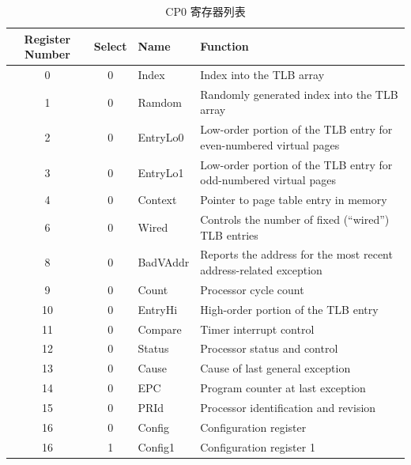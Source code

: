 \documentclass[blue,normal,cn,hide]{elegantbook}
\begin{document}
 \begin{table}
    \renewcommand\arraystretch{1.25}
    \centering
    \begin{tabular}{cclm{}}
        \toprule 
        \rowcolor{black!20} \textbf{Register Number} & \textbf{Select} & \textbf{Name} & \textbf{Function} \\
        \midrule
        \rowcolor{green!20} 0 & 0 & Index & Index into the TLB array \\
        \rowcolor{green!20} 1 & 0 & Ramdom & Randomly generated index into the TLB array \\
        \rowcolor{green!20} 2 & 0 & EntryLo0 & Low-order portion of the TLB entry for
        even-numbered virtual pages \\
        \rowcolor{green!20} 3 & 0 & EntryLo1 & Low-order portion of the TLB entry for
        odd-numbered virtual pages \\
        \rowcolor{green!20} 4 & 0 & Context & Pointer to page table entry in memory \\
        \rowcolor{green!20} 6 & 0 & Wired & Controls the number of fixed (“wired”) TLB
        entries \\
        \rowcolor{cyan!20} 8 & 0 & BadVAddr & Reports the address for the most recent
        address-related exception \\
        \rowcolor{cyan!20} 9 & 0 & Count & Processor cycle count \\
        \rowcolor{green!20} 10 & 0 & EntryHi & High-order portion of the TLB entry \\
        \rowcolor{cyan!20} 11 & 0 & Compare & Timer interrupt control \\
        \rowcolor{cyan!20} 12 & 0 & Status &  Processor status and control \\
        \rowcolor{cyan!20} 13 & 0 & Cause & Cause of last general exception \\
        \rowcolor{cyan!20} 14 & 0 & EPC & Program counter at last exception \\
        \rowcolor{green!20} 15 & 0 & PRId & Processor identification and revision \\
        \rowcolor{green!20} 16 & 0 & Config &  Configuration register \\
        \rowcolor{green!20} 16 & 1 & Config1 & Configuration register 1 \\

        \bottomrule
    \end{tabular}
    \caption{CP0 寄存器列表}
    \label{tab:SiriusCP0}
\end{table}


\end{document}
